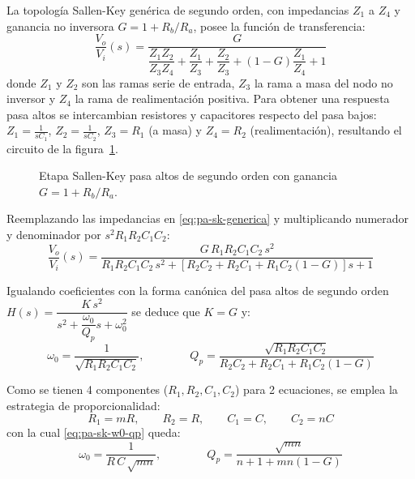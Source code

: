 La topología Sallen-Key genérica de segundo orden, con impedancias $Z_1$ a $Z_4$ y ganancia no inversora
$G = 1 + R_b / R_a$, posee la función de transferencia:
\begin{equation}
  \frac{V_o}{V_i}(s) = \frac{G}{\dfrac{Z_1 Z_2}{Z_3 Z_4} + \dfrac{Z_1}{Z_3} + \dfrac{Z_2}{Z_3}
    + (1 - G)\dfrac{Z_1}{Z_4} + 1}
  \label{eq:pa-sk-generica}
\end{equation}
donde $Z_1$ y $Z_2$ son las ramas serie de entrada, $Z_3$ la rama a masa del nodo no inversor y $Z_4$ la rama de
realimentación positiva. Para obtener una respuesta pasa altos se intercambian resistores y capacitores respecto del
pasa bajos: $Z_1 = \frac{1}{s C_1}$, $Z_2 = \frac{1}{s C_2}$, $Z_3 = R_1$ (a masa) y $Z_4 = R_2$ (realimentación),
resultando el circuito de la figura~\ref{crkt:sk-pasa-altos}.

\begin{figure}[H]
  \centering
  
  \caption{Etapa Sallen-Key pasa altos de segundo orden con ganancia $G = 1 + R_b / R_a$.}
  \label{crkt:sk-pasa-altos}
\end{figure}

Reemplazando las impedancias en \eqref{eq:pa-sk-generica} y multiplicando numerador y denominador por
$s^2 R_1 R_2 C_1 C_2$:
\begin{equation}
  \frac{V_o}{V_i}(s) = \frac{G\,R_1 R_2 C_1 C_2\,s^2}{R_1 R_2 C_1 C_2\,s^2
    + \left[ R_2 C_2 + R_2 C_1 + R_1 C_2 (1 - G) \right] s + 1}
  \label{eq:pa-sk-h}
\end{equation}

Igualando coeficientes con la forma canónica del pasa altos de segundo orden
$H(s) = \dfrac{K\,s^2}{s^2 + \dfrac{\omega_0}{Q_p} s + \omega_0^2}$ se deduce que $K = G$ y:
\begin{equation}
  \omega_0 = \frac{1}{\sqrt{R_1 R_2 C_1 C_2}}, \qquad\qquad
  Q_p = \frac{\sqrt{R_1 R_2 C_1 C_2}}{R_2 C_2 + R_2 C_1 + R_1 C_2 (1 - G)}
  \label{eq:pa-sk-w0-qp}
\end{equation}

Como se tienen 4 componentes ($R_1, R_2, C_1, C_2$) para 2 ecuaciones, se emplea la estrategia de proporcionalidad:
\begin{equation}
  R_1 = m R, \qquad R_2 = R, \qquad C_1 = C, \qquad C_2 = n C
\end{equation}
con la cual \eqref{eq:pa-sk-w0-qp} queda:
\begin{equation}
  \omega_0 = \frac{1}{R\,C\,\sqrt{m n}}, \qquad\qquad Q_p = \frac{\sqrt{m n}}{n + 1 + m n (1 - G)}
  \label{eq:pa-sk-prop}
\end{equation}

